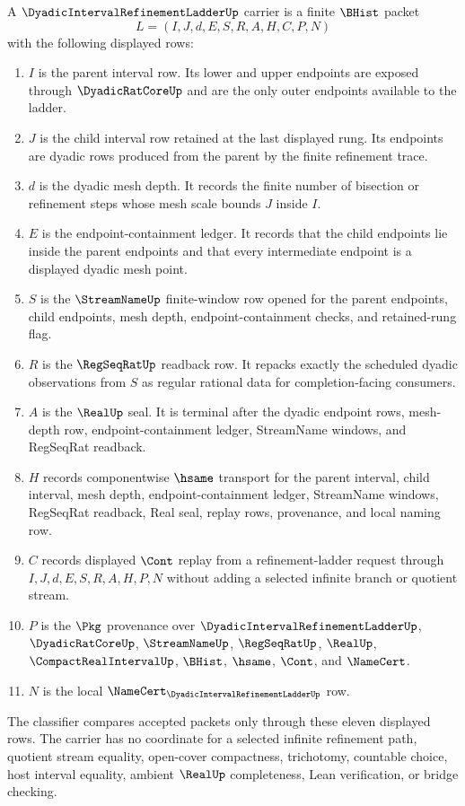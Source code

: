 \begin{definition}
\label{def:dyadic-interval-refinement-ladder-carrier}
A $\DyadicIntervalRefinementLadderUp$ carrier is a finite $\BHist$ packet
$$
L=(I,J,d,E,S,R,A,H,C,P,N)
$$
with the following displayed rows:
\begin{enumerate}
\item $I$ is the parent interval row. Its lower and upper endpoints are exposed through $\DyadicRatCoreUp$ and are the only outer endpoints available to the ladder.
\item $J$ is the child interval row retained at the last displayed rung. Its endpoints are dyadic rows produced from the parent by the finite refinement trace.
\item $d$ is the dyadic mesh depth. It records the finite number of bisection or refinement steps whose mesh scale bounds $J$ inside $I$.
\item $E$ is the endpoint-containment ledger. It records that the child endpoints lie inside the parent endpoints and that every intermediate endpoint is a displayed dyadic mesh point.
\item $S$ is the $\StreamNameUp$ finite-window row opened for the parent endpoints, child endpoints, mesh depth, endpoint-containment checks, and retained-rung flag.
\item $R$ is the $\RegSeqRatUp$ readback row. It repacks exactly the scheduled dyadic observations from $S$ as regular rational data for completion-facing consumers.
\item $A$ is the $\RealUp$ seal. It is terminal after the dyadic endpoint rows, mesh-depth row, endpoint-containment ledger, StreamName windows, and RegSeqRat readback.
\item $H$ records componentwise $\hsame$ transport for the parent interval, child interval, mesh depth, endpoint-containment ledger, StreamName windows, RegSeqRat readback, Real seal, replay rows, provenance, and local naming row.
\item $C$ records displayed $\Cont$ replay from a refinement-ladder request through $I,J,d,E,S,R,A,H,P,N$ without adding a selected infinite branch or quotient stream.
\item $P$ is the $\Pkg$ provenance over $\DyadicIntervalRefinementLadderUp$, $\DyadicRatCoreUp$, $\StreamNameUp$, $\RegSeqRatUp$, $\RealUp$, $\CompactRealIntervalUp$, $\BHist$, $\hsame$, $\Cont$, and $\NameCert$.
\item $N$ is the local $\NameCert_{\DyadicIntervalRefinementLadderUp}$ row.
\end{enumerate}
The classifier compares accepted packets only through these eleven displayed rows. The carrier has no coordinate for a selected infinite refinement path, quotient stream equality, open-cover compactness, trichotomy, countable choice, host interval equality, ambient $\RealUp$ completeness, Lean verification, or bridge checking.
\end{definition}

